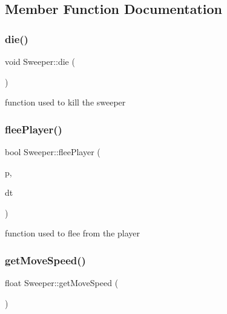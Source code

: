 \subsection{Member Function Documentation}
\mbox{\label{class_sweeper_a5ef8f36cd096c86448db221b8d26298f}} 
\subsubsection{\texorpdfstring{die()}{die()}}
{\footnotesize\ttfamily void Sweeper\+::die (\begin{DoxyParamCaption}{ }\end{DoxyParamCaption})}

function used to kill the sweeper \mbox{\label{class_sweeper_a449bae50886a8b27fceed990054693e5}} 
\subsubsection{\texorpdfstring{fleePlayer()}{fleePlayer()}}
{\footnotesize\ttfamily bool Sweeper\+::flee\+Player (\begin{DoxyParamCaption}\item[{\mbox{\hyperlink{struct_sweeper_1_1bool_vec_pair}{bool\+Vec\+Pair}} \&}]{p,  }\item[{double}]{dt }\end{DoxyParamCaption})}

function used to flee from the player \mbox{\label{class_sweeper_a2bbd96a95a34c2612b559224bd99a2a0}} 
\subsubsection{\texorpdfstring{getMoveSpeed()}{getMoveSpeed()}}
{\footnotesize\ttfamily float Sweeper\+::get\+Move\+Speed (\begin{DoxyParamCaption}{ }\end{DoxyParamCaption})\hspace{0.3cm}{\ttfamily [inline]}}

\mbox{\label{class_sweeper_a8308b5cec3c19e0292947081100d777b}} 
